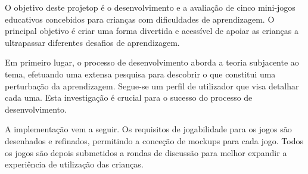 


O objetivo deste projetop é o desenvolvimento e a avaliação de cinco mini-jogos educativos concebidos para crianças com dificuldades de aprendizagem. O principal objetivo é criar uma forma divertida e acessível de apoiar as crianças a ultrapassar diferentes desafios de aprendizagem.

Em primeiro lugar, o processo de desenvolvimento aborda a teoria subjacente ao tema, efetuando uma extensa pesquisa para descobrir o que constitui uma perturbação da aprendizagem. Segue-se um perfil de utilizador que visa detalhar cada uma. Esta investigação é crucial para o sucesso do processo de desenvolvimento.

A implementação vem a seguir. Os requisitos de jogabilidade para os jogos são desenhados e refinados, permitindo a conceção de mockups para cada jogo. Todos os jogos são depois submetidos a rondas de discussão para melhor expandir a experiência de utilização das crianças.

